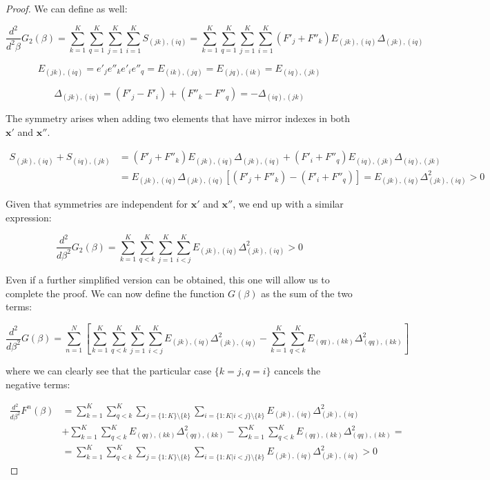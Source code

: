 \begin{proof}
We can define as well:

$$
\frac{d^2}{d^2 \beta} G_2(\beta) = \sum_{k=1}^K \sum_{q=1}^K \sum_{j=1}^K \sum_{i=1}^K S_{(jk),(iq)} = \sum_{k=1}^K \sum_{q=1}^K \sum_{j=1}^K \sum_{i=1}^K (F'_j + F''_k) E_{(jk),(iq)} \Delta_{(jk),(iq)} 
$$

$$
E_{(jk),(iq)} = e'_j e''_k e'_i e''_q = E_{(ik),(jq)} = E_{(jq),(ik)} = E_{(iq),(jk)}
$$

$$
\Delta_{(jk),(iq)} = (F'_j - F'_i) + (F''_k - F''_q) = - \Delta_{(iq),(jk)}
$$

The symmetry arises when adding two elements that have mirror indexes in both $\bm{x}'$ and $\bm{x}''$.

$$
\begin{aligned}
S_{(jk),(iq)} + S_{(iq),(jk)} & = (F'_j + F''_k) E_{(jk),(iq)} \Delta_{(jk),(iq)} + (F'_i + F''_q) E_{(iq),(jk)} \Delta_{(iq),(jk)} \\
& = E_{(jk),(iq)} \Delta_{(jk),(iq)} [(F'_j + F''_k) - (F'_i + F''_q)] = E_{(jk),(iq)} \Delta_{(jk),(iq)}^2 > 0
\end{aligned}
$$

Given that symmetries are independent for $\bm{x}'$ and $\bm{x}''$, we end up with a similar expression:

$$
\frac{d^2}{d \beta ^2} G_2(\beta) = \sum_{k=1}^K \sum_{q<k}^K \sum_{j=1}^K \sum_{i<j}^K E_{(jk),(iq)}\Delta_{(jk),(iq)}^2 > 0
$$

Even if a further simplified version can be obtained, this one will allow us to complete the proof. We can now define the function $G(\beta)$ as the sum of the two terms:

$$
\frac{d^2}{d \beta ^2} G(\beta) = \sum_{n=1}^N \left [ \sum_{k=1}^K \sum_{q<k}^K \sum_{j=1}^K \sum_{i<j}^K E_{(jk),(iq)}\Delta_{(jk),(iq)}^2 - \sum_{k=1}^K \sum_{q<k}^K E_{(qq), (kk)}\Delta_{(qq), (kk)}^2 \right ]
$$

where we can clearly see that the particular case $\{ k=j, q=i \}$ cancels the negative terms:

$$
\begin{aligned}
    \frac{d^2}{d \beta ^2} F^n(\beta) & = \sum_{k=1}^K \sum_{q<k}^K \sum_{j = \{ 1:K \} \setminus \{ k \} } \sum_{i = \{ 1:K | i < j\} \setminus \{ k \} } E_{(jk),(iq)}\Delta_{(jk),(iq)}^2  \\ 
    & + \sum_{k=1}^K \sum_{q<k}^K E_{(qq), (kk)}\Delta_{(qq), (kk)}^2 - \sum_{k=1}^K \sum_{q<k}^K E_{(qq), (kk)}\Delta_{(qq), (kk)}^2 = \\
    & = \sum_{k=1}^K \sum_{q<k}^K \sum_{j = \{ 1:K \} \setminus \{ k \} } \sum_{i = \{ 1:K | i < j\} \setminus \{ k \} } E_{(jk),(iq)}\Delta_{(jk),(iq)}^2 > 0
\end{aligned}
$$


\end{proof}
